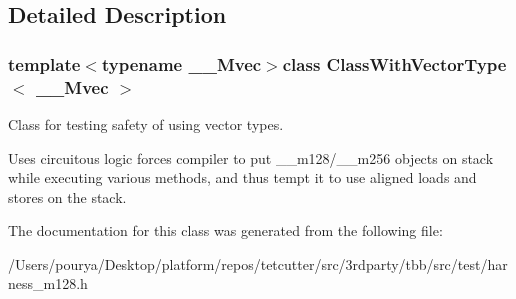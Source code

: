 \subsection{Detailed Description}
\subsubsection*{template$<$typename \+\_\+\+\_\+\+Mvec$>$class Class\+With\+Vector\+Type$<$ \+\_\+\+\_\+\+Mvec $>$}

Class for testing safety of using vector types. 

Uses circuitous logic forces compiler to put \+\_\+\+\_\+m128/\+\_\+\+\_\+m256 objects on stack while executing various methods, and thus tempt it to use aligned loads and stores on the stack. 

The documentation for this class was generated from the following file\+:\begin{DoxyCompactItemize}
\item 
/\+Users/pourya/\+Desktop/platform/repos/tetcutter/src/3rdparty/tbb/src/test/harness\+\_\+m128.\+h\end{DoxyCompactItemize}
